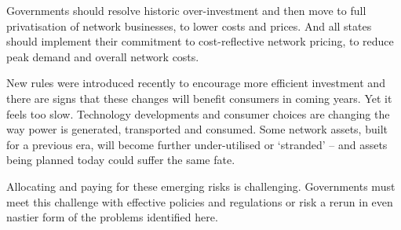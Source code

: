 \documentclass[FrontPage]{grattan}
\begin{document}
\begin{overview}
Governments should resolve historic over-investment and then move to full privatisation of network businesses, to lower costs and prices. And all states should implement their commitment to cost-reflective network pricing, to reduce peak demand and overall network costs.

New rules were introduced recently to encourage more efficient investment and there are signs that these changes will benefit consumers in coming years. Yet it feels too slow. Technology developments and consumer choices are changing the way power is generated, transported and consumed. Some network assets, built for a previous era, will become further under-utilised or `stranded' -- and assets being planned today could suffer the same fate. 

Allocating and paying for these emerging risks is challenging. Governments must meet this challenge with effective policies and regulations or risk a rerun in even nastier form of the problems identified here.

\end{overview}
\end{document}
